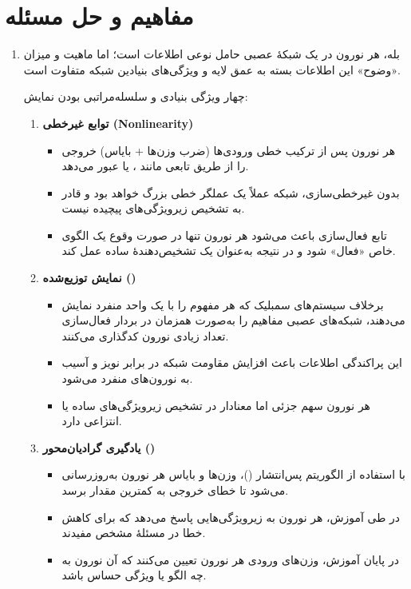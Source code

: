 \section{مفاهیم و حل مسئله}
\begin{enumerate}
	\item بله، هر نورون در یک شبکهٔ عصبی حامل نوعی اطلاعات است؛ اما ماهیت و میزان «وضوح» این اطلاعات بسته به عمق لایه و ویژگی‌های بنیادین شبکه متفاوت است. 
	
	
	 چهار ویژگی بنیادی و سلسله‌مراتبی بودن نمایش:
	
	\begin{enumerate}
		\item \textbf{توابع غیرخطی (Nonlinearity)}
		\begin{itemize}
			\item هر نورون پس از ترکیب خطی ورودی‌ها (ضرب وزن‌ها + بایاس) خروجی را از طریق تابعی مانند ،  یا  عبور می‌دهد.
			\item بدون غیرخطی‌سازی، شبکه عملاً یک عملگر خطی بزرگ خواهد بود و قادر به تشخیص زیرویژگی‌های پیچیده نیست.
			\item تابع فعال‌سازی باعث می‌شود هر نورون تنها در صورت وقوع یک الگوی خاص «فعال» شود و در نتیجه به‌عنوان یک تشخیص‌دهندهٔ ساده عمل کند.
		\end{itemize}
		
		\item \textbf{نمایش توزیع‌شده ()}
		\begin{itemize}
			\item برخلاف سیستم‌های سمبلیک که هر مفهوم را با یک واحد منفرد نمایش می‌دهند، شبکه‌های عصبی مفاهیم را به‌صورت همزمان در بردار فعال‌سازی تعداد زیادی نورون کدگذاری می‌کنند.
			\item این پراکندگی اطلاعات باعث افزایش مقاومت شبکه در برابر نویز و آسیب به نورون‌های منفرد می‌شود.
			\item هر نورون سهم جزئی اما معنادار در تشخیص زیرویژگی‌های ساده یا انتزاعی دارد.
		\end{itemize}
		
		\item \textbf{یادگیری گرادیان‌محور ()}
		\begin{itemize}
			\item با استفاده از الگوریتم پس‌انتشار ()، وزن‌ها و بایاس هر نورون به‌روزرسانی می‌شود تا خطای خروجی به کمترین مقدار برسد.
			\item در طی آموزش، هر نورون به زیرویژگی‌هایی پاسخ می‌دهد که برای کاهش خطا در مسئلهٔ مشخص مفیدند.
			\item در پایان آموزش، وزن‌های ورودی هر نورون تعیین می‌کنند که آن نورون به چه الگو یا ویژگی‌ حساس باشد.
		\end{itemize}
		

\end{enumerate}
\end{enumerate}
